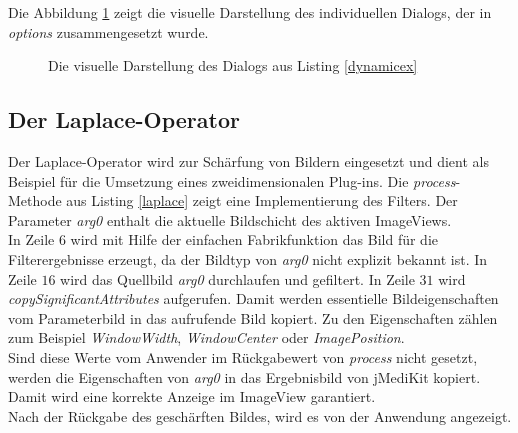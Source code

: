 Die Abbildung \ref{dialog_example} zeigt die visuelle Darstellung des individuellen Dialogs, der in \textit{options} zusammengesetzt wurde. 

\begin{figure}[htbp]
  \vspace{0.5cm}
  \centering
   \caption{Die visuelle Darstellung des Dialogs aus Listing \ref{dynamicex}}
  \label{dialog_example}
  \vspace{0.5cm}
\end{figure}

\FloatBarrier
\subsection{Der Laplace-Operator}

Der Laplace-Operator wird zur Schärfung von Bildern eingesetzt und dient als Beispiel für die Umsetzung eines zweidimensionalen Plug-ins. Die \textit{process}-Methode aus Listing \ref{laplace} zeigt eine Implementierung des Filters. Der Parameter \textit{arg0} enthalt die aktuelle Bildschicht des aktiven ImageViews.\\
In Zeile $6$ wird mit Hilfe der einfachen Fabrikfunktion das Bild für die Filterergebnisse erzeugt, da der Bildtyp von \textit{arg0} nicht explizit bekannt ist. In Zeile $16$ wird das Quellbild \textit{arg0} durchlaufen und gefiltert. In Zeile $31$ wird \textit{copySignificantAttributes} aufgerufen. Damit werden essentielle Bildeigenschaften vom Parameterbild in das aufrufende Bild kopiert. Zu den Eigenschaften zählen zum Beispiel \textit{WindowWidth}, \textit{WindowCenter} oder \textit{ImagePosition}.\\
Sind diese Werte vom Anwender im Rückgabewert von \textit{process} nicht gesetzt, werden die Eigenschaften von \textit{arg0} in das Ergebnisbild von jMediKit kopiert. Damit wird eine korrekte Anzeige im ImageView garantiert.\\
Nach der Rückgabe des geschärften Bildes, wird es von der Anwendung angezeigt.

